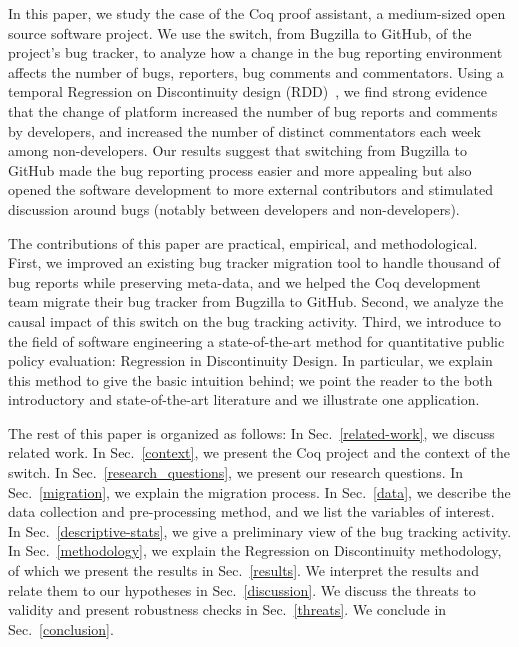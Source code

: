 \documentclass[conference]{IEEEtran}
\begin{document}
In this paper, we study the case of the Coq proof assistant, a medium-sized open source software project. We use the switch, from Bugzilla to GitHub, of the project's bug tracker, to analyze how a change in the bug reporting environment affects the number of bugs, reporters, bug comments and commentators. Using a temporal Regression on Discontinuity design (RDD)~\cite{angrist2008mostly,angrist2014mastering,jacob2012practical,lee2010regression,hausman2018regression}, we find strong evidence that the change of platform increased the number of bug reports and comments by developers, and increased the number of distinct commentators each week among non-developers. Our results suggest that switching from Bugzilla to GitHub made the bug reporting process easier and more appealing but also opened the software development to more external contributors and stimulated discussion around bugs (notably between developers and non-developers).

The contributions of this paper are practical, empirical, and methodological. First, we improved an existing bug tracker migration tool to handle thousand of bug reports while preserving meta-data, and we helped the Coq development team migrate their bug tracker from Bugzilla to GitHub. Second, we analyze the causal impact of this switch on the bug tracking activity. Third, we introduce to the field of software engineering a state-of-the-art method for quantitative public policy evaluation: Regression in Discontinuity Design. In particular, we explain this method to give the basic intuition behind; we point the reader to the both introductory and state-of-the-art literature and we illustrate one application.

The rest of this paper is organized as follows: In Sec.~\ref{related-work}, we discuss related work. In Sec.~\ref{context}, we present the Coq project and the context of the switch. In Sec.~\ref{research_questions}, we present our research questions. In Sec.~\ref{migration}, we explain the migration process. In Sec.~\ref{data}, we describe the data collection and pre-processing method, and we list the variables of interest. In Sec.~\ref{descriptive-stats}, we give a preliminary view of the bug tracking activity. In Sec.~\ref{methodology}, we explain the Regression on Discontinuity methodology, of which we present the results in Sec.~\ref{results}. We interpret the results and relate them to our hypotheses in Sec.~\ref{discussion}. We discuss the threats to validity and  present robustness checks in Sec.~\ref{threats}. We conclude in Sec.~\ref{conclusion}.
\end{document}
